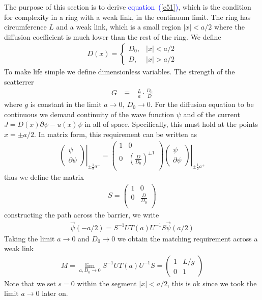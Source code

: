 \documentclass[aps,pre,floats,floatfix,twocolumn]{revtex4}
\newcommand{\beq}{\begin{eqnarray}}
\newcommand{\eeq}{\end{eqnarray}}
\newcommand{\Eq}[1]{\textcolor{blue}{{equation}\!~(\ref{#1})}}
\begin{document}
The purpose of this section is to derive \Eq{e51}, which is the condition for complexity 
in a ring with a weak link, in the continuum limit.
The ring has circumference $L$ and a weak link, which is a small region $|x|<a/2$ where the diffusion
coefficient is much lower than the rest of the ring.
We define 
%
\beq
D(x) = \left\{ \begin{array}{cc}
D_0, & |x|<a/2 \\
D, & |x|>a/2 
\end{array}
\right.
\eeq
%
To make life simple we define dimensionless variables.
The strength of the scatterrer 
%
\beq
G \ & \equiv & \ \frac{L}{a}\cdot \frac{D_0}{D} 
\eeq
%
where $g$ is constant in the limit $a\to 0,\  D_0 \to 0$.
For the diffusion equation to be continuous we demand continuity of the wave function $\psi$ and of the current $J=D(x)\partial \psi -u(x) \psi$ in all of space.
Specifically, this must hold at the points $x=\pm a/2$. In matrix form, this requirement can be written as 
%
\beq
\left.\left( \begin{array}{c}
\psi \\
\partial \psi
\end{array}
\right)\right|_{\pm\frac{1}{2} a^-} =  
\left(
\begin{array}{cc}
 1 & 0 \\
0 & \left(\frac{D}{D_0}\right)^{\pm1} \\
\end{array}
\right)
\left.
\left( \begin{array}{c}
\psi \\
\partial \psi
\end{array}
\right) \right|_{\pm\frac{1}{2} a^+} 
\eeq
%
thus we define the matrix
%
\beq
S = \left(
\begin{array}{cc}
 1 & 0 \\
0 & \frac{D}{D_0} \\
\end{array}
\right)
\eeq
%
constructing the path across the barrier, we write
%
\beq
\vec{\psi}(-a/2)=S^{-1}UT(a)U^{-1}S\vec \psi(a/2) \eeq
%
Taking the limit $a \to 0$ and $D_0 \to 0$ we obtain the matching requirement across a weak link
%
\beq
M = \lim_{a,D_0\to 0} S^{-1}UT(a)U^{-1}S = \left( \begin{array}{cc}
1 & L/g \\
0 & 1
\end{array}
\right)
\eeq
%
Note that we set $s=0$ within the segment $|x|<a/2$, this is ok since we took the limit $a\to 0$ later on. 
\end{document}
